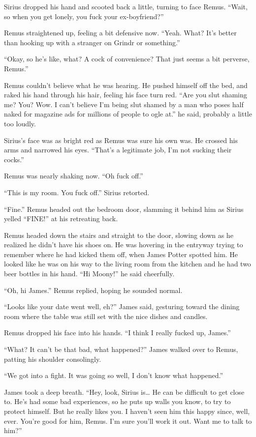\documentclass[12pt,twoside,openright]{memoir}
\begin{document}
Sirius dropped his hand and scooted back a little, turning to face Remus. ``Wait, so when you get lonely, you fuck your ex-boyfriend?''

Remus straightened up, feeling a bit defensive now. ``Yeah. What? It's better than hooking up with a stranger on Grindr or something.''

``Okay, so he's like, what? A cock of convenience? That just seems a bit perverse, Remus.''

Remus couldn't believe what he was hearing. He pushed himself off the bed, and raked his hand through his hair, feeling his face turn red. ``Are you slut shaming me? You? Wow. I can't believe I'm being slut shamed by a man who poses half naked for magazine ads for millions of people to ogle at.'' he said, probably a little too loudly. 

Sirius's face was as bright red as Remus was sure his own was. He crossed his arms and narrowed his eyes. ``That's a legitimate job, I'm not sucking their cocks.''

Remus was nearly shaking now. ``Oh fuck off.''

``This is my room. You fuck off.'' Sirius retorted.

``Fine.'' Remus headed out the bedroom door, slamming it behind him as Sirius yelled ``FINE!'' at his retreating back.

Remus headed down the stairs and straight to the door, slowing down as he realized he didn't have his shoes on. He was hovering in the entryway trying to remember where he had kicked them off, when James Potter spotted him. He looked like he was on his way to the living room from the kitchen and he had two beer bottles in his hand. ``Hi Moony!'' he said cheerfully. 

``Oh, hi James.'' Remus replied, hoping he sounded normal.

``Looks like your date went well, eh?'' James said, gesturing toward the dining room where the table was still set with the nice dishes and candles.

Remus dropped his face into his hands. ``I think I really fucked up, James.''

``What? It can't be that bad, what happened?'' James walked over to Remus, patting his shoulder consolingly.

``We got into a fight. It was going so well, I don't know what happened.''

James took a deep breath. ``Hey, look, Sirius is… He can be difficult to get close to. He's had some bad experiences, so he puts up walls you know, to try to protect himself. But he really likes you. I haven't seen him this happy since, well, ever. You're good for him, Remus. I'm sure you'll work it out. Want me to talk to him?''
\end{document}
